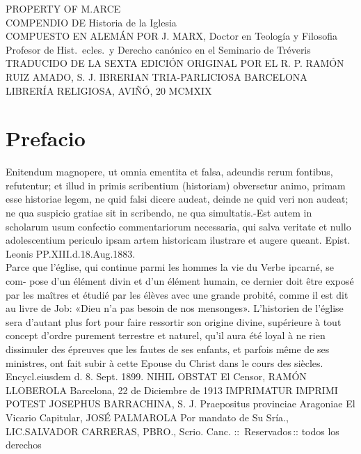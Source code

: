 \documentclass[12pt]{book}
\begin{document}
PROPERTY
OF
M.ARCE\\
COMPENDIO
DE
Historia de la Iglesia\\
COMPUESTO EN ALEMÁN POR
J. MARX, Doctor en Teología y Filosofia
Profesor de Hist.\ ecles.\ y Derecho canónico en el Seminario de Tréveris
TRADUCIDO DE LA SEXTA EDICIÓN ORIGINAL
POR EL
R. P. RAMÓN RUIZ AMADO, S. J.
IBRERIAN
TRIA-PARLICIOSA
BARCELONA
LIBRERÍA RELIGIOSA, AVIÑÓ, 20
MCMXIX

\section{Prefacio}
Enitendum magnopere, ut omnia ementita et falsa, adeundis rerum fontibus, refutentur; et illud in primis scribentium (historiam) obversetur animo, primam esse historiae legem, ne quid falsi dicere audeat, deinde ne quid veri non audeat; ne qua suspicio gratiae sit in scribendo, ne qua simultatis.-Est autem in scholarum usum confectio commentariorum necessaria, qui salva veritate et nullo adolescentium periculo ipsam artem historicam ilustrare et augere queant. Epist. Leonis PP.\@ XIII.\@ d.\@ 18.\@ Aug.\@ 1883.\\

Parce que l'église, qui continue parmi les hommes la vie du Verbe ipcarné, se com-
pose d'un élément divin et d'un élément humain, ce dernier doit être exposé par les
maîtres et étudié par les élèves avec une grande probité, comme il est dit au livre de
Job: «Dieu n'a pas besoin de nos mensonges». L'historien de l'église sera d'autant plus
fort pour faire ressortir son origine divine, supérieure à tout concept d'ordre purement
terrestre et naturel, qu'il aura été loyal à ne rien dissimuler des épreuves que les fautes
de ses enfants, et parfois même de ses ministres, ont fait subir à cette Epouse du Christ
dans le cours des siècles.
Encycl.\@ eiusdem d. 8. Sept. 1899.
NIHIL OBSTAT
El Censor,
RAMÓN LLOBEROLA
Barcelona, 22 de Diciembre de 1913
IMPRIMATUR
IMPRIMI POTEST
JOSEPHUS BARRACHINA, S. J.
Praepositus provinciae Aragoniae
El Vicario Capitular,
JOSÉ PALMAROLA
Por mandato de Su Sría.,
LIC.\@ SALVADOR CARRERAS, PBRO.,
Scrio. Canc.
\quad::\, Reservados\,:: \quad
todos los derechos
\end{document}
